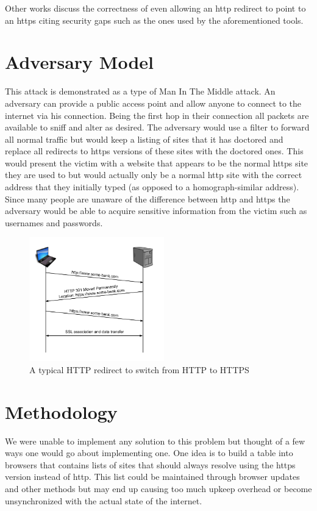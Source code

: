\documentclass{article}
\begin{document}
Other works discuss the correctness of even allowing an http redirect to point to an https citing security gaps such as the ones used by the aforementioned tools.

\section{Adversary Model}
This attack is demonstrated as a type of Man In The Middle attack.  An adversary can provide a public access point and allow anyone to connect to the internet via his connection.  Being the first hop in their connection all packets are available to sniff and alter as desired.  The adversary would use a filter to forward all normal traffic but would keep a listing of sites that it has doctored and replace all redirects to https versions of these sites with the doctored ones.  This would present the victim with a website that appears to be the normal https site they are used to but would actually only be a normal http site with the correct address that they initially typed (as opposed to a homograph-similar address).  Since many people are unaware of the difference between http and https the adversary would be able to acquire sensitive information from the victim such as usernames and passwords.

\begin{figure}[t]
\begin{center}

\includegraphics[width=2.3in]{normal_redirect.png} 
\caption{A typical HTTP redirect to switch from HTTP to HTTPS} 
\label{fg:redirect}

\end{center}
\end{figure}

\section{Methodology}
We were unable to implement any solution to this problem but thought of a few ways one would go about implementing one.
One idea is to build a table into browsers that contains lists of sites that should always resolve using the https version instead of http.  This list could be maintained through browser updates and other methods but may end up causing too much upkeep overhead or become unsynchronized with the actual state of the internet.
\end{document}

